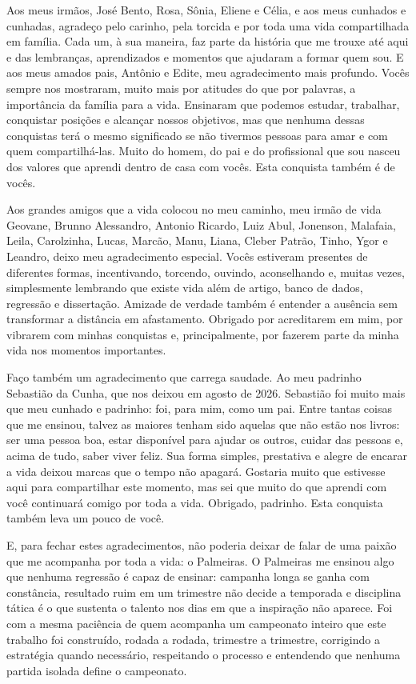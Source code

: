 \begin{agradecimentos}
Aos meus irmãos, José Bento, Rosa, Sônia, Eliene e Célia, e aos meus cunhados e
cunhadas, agradeço pelo carinho, pela torcida e por toda uma vida compartilhada
em família. Cada um, à sua maneira, faz parte da história que me trouxe até aqui
e das lembranças, aprendizados e momentos que ajudaram a formar quem sou. E aos
meus amados pais, Antônio e Edite, meu agradecimento mais profundo. Vocês sempre
nos mostraram, muito mais por atitudes do que por palavras, a importância da
família para a vida. Ensinaram que podemos estudar, trabalhar, conquistar
posições e alcançar nossos objetivos, mas que nenhuma dessas conquistas terá o
mesmo significado se não tivermos pessoas para amar e com quem compartilhá-las.
Muito do homem, do pai e do profissional que sou nasceu dos valores que aprendi
dentro de casa com vocês. Esta conquista também é de vocês.

Aos grandes amigos que a vida colocou no meu caminho, meu irmão de vida
Geovane, Brunno Alessandro, Antonio Ricardo, Luiz Abul,
Jonenson, Malafaia, Leila, Carolzinha, Lucas,
Marcão, Manu, Liana, Cleber Patrão, Tinho, Ygor e Leandro, deixo meu agradecimento
especial. Vocês estiveram presentes de diferentes formas, incentivando,
torcendo, ouvindo, aconselhando e, muitas vezes, simplesmente lembrando que
existe vida além de artigo, banco de dados, regressão e dissertação. Amizade de
verdade também é entender a ausência sem transformar a distância em
afastamento. Obrigado por acreditarem em mim, por vibrarem com minhas conquistas
e, principalmente, por fazerem parte da minha vida nos momentos importantes.

Faço também um agradecimento que carrega saudade. Ao meu padrinho Sebastião da
Cunha, que nos deixou em agosto de 2026. Sebastião foi muito mais que meu
cunhado e padrinho: foi, para mim, como um pai. Entre tantas coisas que me
ensinou, talvez as maiores tenham sido aquelas que não estão nos livros: ser uma
pessoa boa, estar disponível para ajudar os outros, cuidar das pessoas e, acima
de tudo, saber viver feliz. Sua forma simples, prestativa e alegre de encarar a
vida deixou marcas que o tempo não apagará. Gostaria muito que estivesse aqui
para compartilhar este momento, mas sei que muito do que aprendi com você
continuará comigo por toda a vida. Obrigado, padrinho. Esta conquista também
leva um pouco de você.

E, para fechar estes agradecimentos, não poderia deixar de falar de uma paixão
que me acompanha por toda a vida: o \textcolor{verdepalmeiras}{Palmeiras}. O
\textcolor{verdepalmeiras}{Palmeiras} me ensinou algo que nenhuma regressão é
capaz de ensinar: campanha longa se ganha com
\textcolor{verdepalmeiras}{constância}, resultado ruim em um trimestre não
decide a temporada e \textcolor{verdepalmeiras}{disciplina} tática é o que
sustenta o talento nos dias em que a inspiração não aparece. Foi com a mesma
\textcolor{verdepalmeiras}{paciência} de quem acompanha um campeonato inteiro
que este trabalho foi construído, rodada a rodada, trimestre a trimestre,
corrigindo a estratégia quando necessário, respeitando o processo e entendendo
que nenhuma partida isolada define o campeonato.


\end{agradecimentos}
